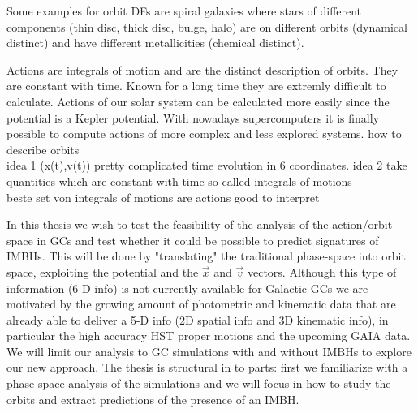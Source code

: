 \par Some examples for orbit \acp{DF} are spiral galaxies where stars of different components (thin disc, thick disc, bulge, halo) are on different orbits (dynamical distinct) and have different metallicities (chemical distinct).
\\\par Actions are integrals of motion and are the distinct description of orbits. They are constant with time. Known for a long time they are extremly difficult to calculate. Actions of our solar system can be calculated more easily since the potential is a Kepler potential. With nowadays supercomputers it is finally possible to compute actions of more complex and less explored systems.
\color{green} how to describe orbits \\ idea 1 (x(t),v(t)) pretty complicated time evolution in 6 coordinates. idea 2 take quantities which are constant with time so called integrals of motions \\ beste set von integrals of motions are actions good to interpret \color{black}
\\\par In this thesis we wish to test the feasibility of the analysis of the action/orbit space in \acp{GC} and test whether it could be possible to predict  signatures of \acp{IMBH}. This will be done by "translating" the traditional phase-space into orbit space, exploiting the potential and the \(\vec{x}\) and \(\vec{v}\) vectors. Although this type of information (6-D info) is not currently available for Galactic \acp{GC} we are motivated by the growing amount of photometric and kinematic data that are already able to deliver a 5-D info (2D spatial info and 3D kinematic info), in particular the high accuracy \ac{HST} proper motions and the upcoming GAIA data. We will limit our analysis to \ac{GC} simulations with and without \acp{IMBH} to explore our new approach. The thesis is structural in to parts: first we familiarize with a phase space analysis of the simulations and we will focus in how to study the orbits and extract predictions of the presence of an \ac{IMBH}.

